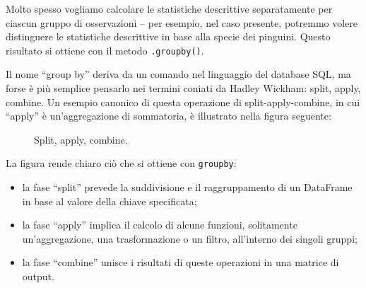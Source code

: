 \documentclass[
  letterpaper,
  krantz2]{{[}./krantz{]}}
\providecommand{\tightlist}{%
  \setlength{\itemsep}{0pt}\setlength{\parskip}{0pt}}\usepackage{longtable,booktabs,array}
\begin{document}
Molto spesso vogliamo calcolare le statistiche descrittive separatamente
per ciascun gruppo di osservazioni -- per esempio, nel caso presente,
potremmo volere distinguere le statistiche descrittive in base alla
specie dei pinguini. Questo risultato si ottiene con il metodo
\texttt{.groupby()}.

Il nome ``group by'' deriva da un comando nel linguaggio del database
SQL, ma forse è più semplice pensarlo nei termini coniati da Hadley
Wickham: split, apply, combine. Un esempio canonico di questa operazione
di split-apply-combine, in cui ``apply'' è un'aggregazione di
sommatoria, è illustrato nella figura seguente:

\begin{figure}


\caption{\label{fig-pandas}Split, apply, combine.}

\end{figure}%

La figura rende chiaro ciò che si ottiene con \texttt{groupby}:

\begin{itemize}
\tightlist
\item
  la fase ``split'' prevede la suddivisione e il raggruppamento di un
  DataFrame in base al valore della chiave specificata;
\item
  la fase ``apply'' implica il calcolo di alcune funzioni, solitamente
  un'aggregazione, una trasformazione o un filtro, all'interno dei
  singoli gruppi;
\item
  la fase ``combine'' unisce i risultati di queste operazioni in una
  matrice di output.
\end{itemize}
\end{document}
